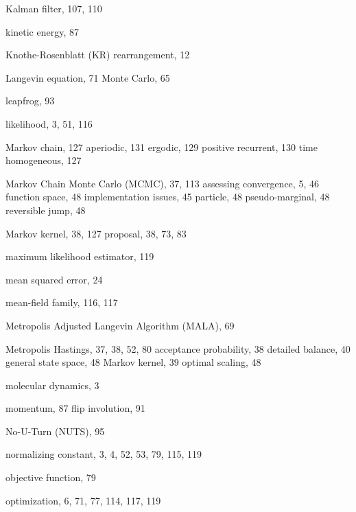 \begin{theindex}
\indexspace

\item Kalman filter, 107, 110
\item kinetic energy, 87
\item Knothe-Rosenblatt (KR) rearrangement, 12

\indexspace

\item Langevin
  \subitem equation, 71
  \subitem Monte Carlo, 65
\item leapfrog, 93
\item likelihood, 3, 51, 116

\indexspace

\item Markov chain, 127
  \subitem aperiodic, 131
  \subitem ergodic, 129
  \subitem positive recurrent, 130
  \subitem time homogeneous, 127
\item Markov Chain Monte Carlo (MCMC), 37, 113
  \subitem assessing convergence, 5, 46
  \subitem function space, 48
  \subitem implementation issues, 45
  \subitem particle, 48
  \subitem pseudo-marginal, 48
  \subitem reversible jump, 48
\item Markov kernel, 38, 127
  \subitem proposal, 38, 73, 83
\item maximum likelihood estimator, 119
\item mean squared error, 24
\item mean-field family, 116, 117
\item Metropolis Adjusted Langevin Algorithm (MALA), 69
\item Metropolis Hastings, 37, 38, 52, 80
  \subitem acceptance probability, 38
  \subitem detailed balance, 40
  \subitem general state space, 48
  \subitem Markov kernel, 39
  \subitem optimal scaling, 48
\item molecular dynamics, 3
\item momentum, 87
  \subitem flip involution, 91

\indexspace

\item No-U-Turn (NUTS), 95
\item normalizing constant, 3, 4, 52, 53, 79, 115, 119

\indexspace

\item objective function, 79
\item optimization, 6, 71, 77, 114, 117, 119

\indexspace


\end{theindex}
